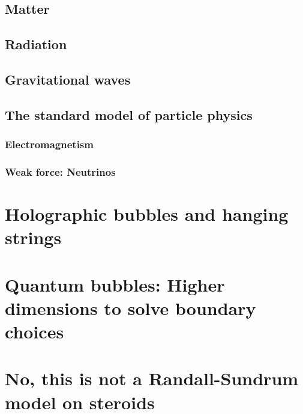 \documentclass[12pt, a4paper]{article} %
\begin{document}
\subsection{Matter}
\subsection{Radiation}
\subsection{Gravitational waves}
\subsection{The standard model of particle physics}
\subsubsection{Electromagnetism}
\subsubsection{Weak force: Neutrinos}
\section{Holographic bubbles and hanging strings}\label{sec: holography_gravity}
\section{Quantum bubbles: Higher dimensions to solve boundary choices}\label{sec: quantum_bubbles}
\section{No, this is not a Randall-Sundrum model on steroids}\label{sec: RS_model}







\end{document}
